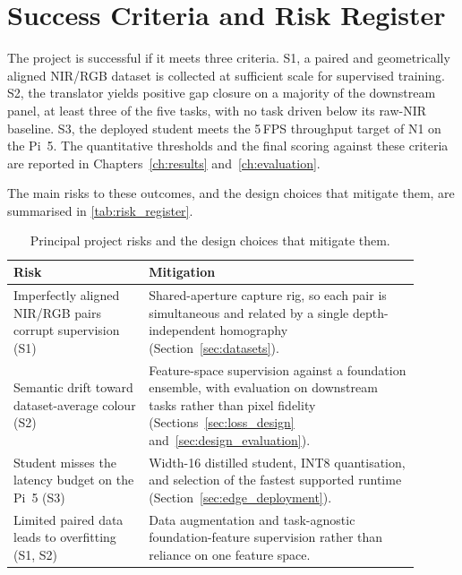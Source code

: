 \section{Success Criteria and Risk Register}
\label{sec:req_success}

The project is successful if it meets three criteria. S1, a paired and geometrically aligned NIR/RGB dataset is collected at sufficient scale for supervised training. S2, the translator yields positive gap closure on a majority of the downstream panel, at least three of the five tasks, with no task driven below its raw-NIR baseline. S3, the deployed student meets the 5\,FPS throughput target of N1 on the Pi~5. The quantitative thresholds and the final scoring against these criteria are reported in Chapters~\ref{ch:results} and~\ref{ch:evaluation}.

The main risks to these outcomes, and the design choices that mitigate them, are summarised in \autoref{tab:risk_register}.

\enlargethispage{3\baselineskip}
\begin{table}[!htbp]
\centering
\footnotesize
\begin{tabular}{p{0.30\linewidth}p{0.60\linewidth}}
\hline
\textbf{Risk} & \textbf{Mitigation} \\
\hline
Imperfectly aligned NIR/RGB pairs corrupt supervision (S1) & Shared-aperture capture rig, so each pair is simultaneous and related by a single depth-independent homography (Section~\ref{sec:datasets}). \\
Semantic drift toward dataset-average colour (S2) & Feature-space supervision against a foundation ensemble, with evaluation on downstream tasks rather than pixel fidelity (Sections~\ref{sec:loss_design} and~\ref{sec:design_evaluation}). \\
Student misses the latency budget on the Pi~5 (S3) & Width-16 distilled student, INT8 quantisation, and selection of the fastest supported runtime (Section~\ref{sec:edge_deployment}). \\
Limited paired data leads to overfitting (S1, S2) & Data augmentation and task-agnostic foundation-feature supervision rather than reliance on one feature space. \\
\hline
\end{tabular}
\caption{Principal project risks and the design choices that mitigate them.}
\label{tab:risk_register}
\end{table}
